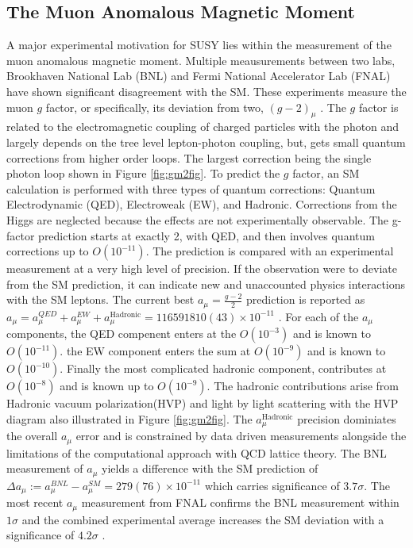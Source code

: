\subsection{The Muon Anomalous Magnetic Moment}

A major experimental motivation for SUSY lies within the measurement of the muon anomalous magnetic moment.  Multiple meausurements between two labs, Brookhaven National Lab (BNL) and Fermi National Accelerator Lab (FNAL) have shown significant disagreement with the SM. These experiments measure the muon $g$ factor, or specifically, its deviation from two, $(g-2)_\mu$ .  The $g$ factor is related to the electromagnetic coupling of charged particles with the photon and largely depends on the tree level lepton-photon coupling, but, gets small quantum corrections from higher order loops. The largest correction being the single photon loop shown in Figure \ref{fig:gm2fig}. To predict the $g$ factor, an SM calculation is performed with three types of quantum corrections: Quantum Electrodynamic (QED), Electroweak (EW), and Hadronic. Corrections from the Higgs are neglected because the effects are not experimentally observable. %
The g-factor prediction starts at exactly 2, with QED, and then involves quantum corrections up to $O(10^{-11})$. The prediction is compared with an experimental measurement at a very high level of precision. If the observation were to deviate from the SM prediction, it can indicate new and unaccounted physics interactions with the SM leptons.
The current best $a_\mu = \frac{g-2}{2}$ prediction is reported as $a_\mu= a_\mu^{QED}+ a_\mu^{EW}+a_\mu^{\text{Hadronic}} =  116 591 810(43) \times 10^{-11}$ \cite{Muong-2:2021ojo}.
 For each of the $a_\mu$ components, the QED compenent enters at the $O(10^{-3})$ and is known to $O(10^{-11})$. the EW component enters the sum at $O(10^{-9})$ and is known to $O(10^{-10})$. Finally the most complicated hadronic component, contributes at $O(10^{-8})$ and is known up to $O(10^{-9})$. The hadronic contributions arise from Hadronic vacuum polarization(HVP) and light by light scattering with the  HVP diagram also illustrated in Figure \ref{fig:gm2fig}. The $a_\mu^{\text{Hadronic}}$ precision dominiates the overall $a_\mu$ error and is constrained by data driven measurements alongside the limitations of the computational approach with QCD lattice theory. The BNL measurement of $a_\mu$ yields a difference with the SM prediction of $\Delta a_\mu := a_\mu^{BNL} - a_\mu^{SM} = 279(76) \times 10^{-11}$ which carries significance of $3.7\sigma$. The most recent $a_\mu$ measurement from FNAL confirms the BNL measurement within $1\sigma$ and the combined experimental average increases the SM deviation with a significance of $4.2\sigma$ \cite{Muong-2:2021ojo}.


